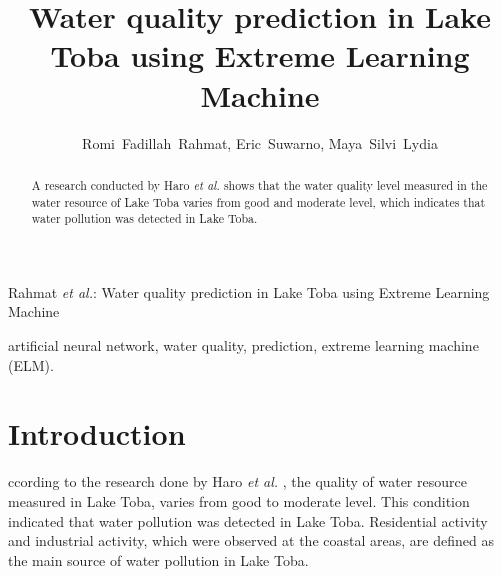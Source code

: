 \documentclass[journal]{IEEEtran}
\begin{document}
	\title{Water quality prediction in Lake Toba using Extreme Learning Machine}
	
	\author{Romi~Fadillah~Rahmat, Eric~Suwarno, Maya~Silvi~Lydia}
	
	\markboth{}%
	{Rahmat \MakeLowercase{\textit{et al.}}: Water quality prediction in Lake Toba using Extreme Learning Machine}


	\maketitle
	
	\begin{abstract}
		A research conducted by Haro \textit{et al.} \cite{bib1} shows that the water quality level measured in the water resource of Lake Toba varies from good and moderate level, which indicates that water pollution was detected in Lake Toba. 
	\end{abstract}
	
	\begin{IEEEkeywords}
		artificial neural network, water quality, prediction, extreme learning machine (ELM).
	\end{IEEEkeywords}

	\IEEEpeerreviewmaketitle

	\section{Introduction}
	
	ccording to the research done by Haro \textit{et al.} \cite{bib1}, the quality of water resource measured in Lake Toba, varies from good to moderate level. This condition indicated that water pollution was detected in Lake Toba. Residential activity and industrial activity, which were observed at the coastal areas, are defined as the main source of water pollution in Lake Toba.
	
\end{document}
